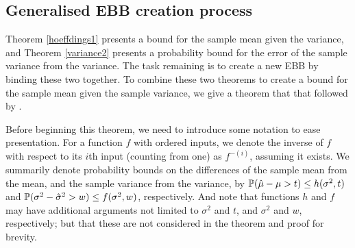 \subsection{Generalised EBB creation process}\label{subsection:general_ebb_creation}

Theorem \ref{hoeffdings1} presents a bound for the sample mean given the variance, and Theorem \ref{variance2} presents a probability bound for the error of the sample variance from the variance. The task remaining is to create a new EBB by binding these two together.
To combine these two theorems to create a bound for the sample mean given the sample variance, we give a theorem that \DIFdelbegin {}\DIFdelend \DIFaddbegin {}\DIFaddend that followed by \cite{Maurer50empiricalbernstein}\DIFaddbegin {}\DIFaddend .

Before beginning this theorem, we need to introduce some notation to ease presentation.
For a function $f$ with ordered inputs, we denote the inverse of $f$ with respect to its $i${th} input (counting from one) as $f^{-(i)}$, assuming it exists.
We summarily denote probability bounds on the differences of the sample mean from the mean, and the sample variance from the variance, by
$\operatorname{\mathbb{P}}(\hat{\mu}-\mu>t)\le h(\sigma^2,t)$ and $\operatorname{\mathbb{P}}(\sigma^2-\hat{\sigma}^2>w)\le f(\sigma^2,w)$, respectively.
And note that functions $h$ and $f$ may have additional arguments not limited to $\sigma^2$ and $t$, and $\sigma^2$ and $w$, respectively; but that these are not considered in the theorem and proof for brevity.

